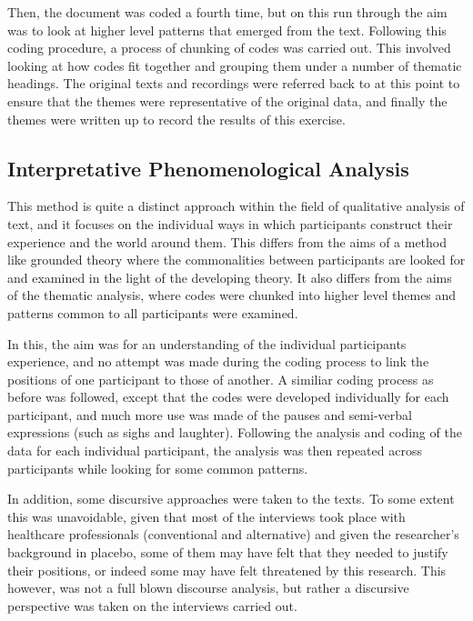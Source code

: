 Then, the document was coded a fourth time, but on this run through the aim was to look at higher level patterns that emerged from the text. Following this coding procedure, a process of chunking of codes was carried out. This involved looking at how codes fit together and grouping them under a number of thematic headings. The original texts and recordings were referred back to at this point to ensure that the themes were representative of the original data, and finally the themes were written up to record the results of this exercise. 

\subsection{Interpretative Phenomenological Analysis}

This method is quite a distinct approach within the field of qualitative analysis of text, and it focuses on the individual ways in which participants construct their experience and the world around them.  This differs from the aims of a method like grounded theory where the commonalities between participants are looked for and examined in the light of the developing theory. It also differs from the aims of the thematic analysis, where codes were chunked into higher level themes and patterns common to all participants were examined. 

In this, the aim was for an understanding of the individual participants experience, and no attempt was made during the coding process to link the positions of one participant to those of another. A similiar coding process as before was followed, except that the codes were developed individually for each participant, and much more use was made of the pauses and semi-verbal expressions (such as sighs and laughter). Following the analysis and coding of the data for each individual participant, the analysis was then repeated across participants while looking for some common patterns. 

In addition, some discursive approaches were taken to the texts. To some extent this was unavoidable, given that most of the interviews took place with healthcare professionals (conventional and alternative) and given the researcher's background in placebo, some of them may have felt that they needed to justify their positions, or indeed some may have felt threatened by this research. This however, was not a full blown discourse analysis, but rather a discursive perspective was taken on the interviews carried out. 

